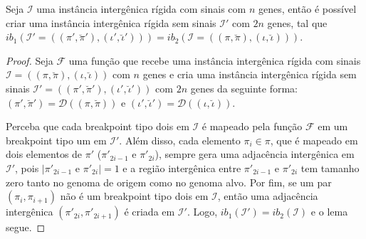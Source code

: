 \pagebreak


\begin{lemma}\label{lemma:FKOCCOYY}
Seja $\mathcal{I}$ uma instância intergênica rígida com sinais com $n$ genes, então é possível criar uma instância intergênica rígida sem sinais $\mathcal{I'}$ com $2n$ genes, tal que $ib_1(\mathcal{I'} = ((\pi',\breve\pi'),(\iota',\breve\iota'))) = ib_2(\mathcal{I} = ((\pi,\breve\pi),(\iota,\breve\iota)))$.
\end{lemma}
\begin{proof}
Seja $\mathcal{F}$ uma função que recebe uma instância intergênica rígida com sinais $\mathcal{I}=((\pi,\breve\pi),(\iota,\breve\iota))$ com $n$ genes e cria uma instância intergênica rígida sem sinais $\mathcal{I'}=((\pi',\breve\pi'),(\iota',\breve\iota'))$ com $2n$ genes da seguinte forma: $(\pi',\breve\pi') = \mathcal{D}((\pi,\breve\pi))$ e $(\iota',\breve\iota') = \mathcal{D}((\iota,\breve\iota))$.

Perceba que cada breakpoint tipo dois em $\mathcal{I}$ é mapeado pela função $\mathcal{F}$ em um breakpoint tipo um em $\mathcal{I'}$. Além disso, cada elemento $\pi_i \in \pi$, que é mapeado em dois elementos de $\pi'$ ($\pi'_{2i-1}$ e $\pi'_{2i}$), sempre gera uma adjacência intergênica em $\mathcal{I'}$, pois $|\pi'_{2i-1}$ e $\pi'_{2i}| = 1$ e a região intergênica entre $\pi'_{2i-1}$ e $\pi'_{2i}$ tem tamanho zero tanto no genoma de origem como no genoma alvo. Por fim, se um par $(\pi_{i},\pi_{i+1})$ não é um breakpoint tipo dois em $\mathcal{I}$, então uma adjacência intergênica $(\pi'_{2i},\pi'_{2i+1})$ é criada em $\mathcal{I'}$. Logo, $ib_1(\mathcal{I'}) = ib_2(\mathcal{I})$ e o lema segue.
\end{proof}

